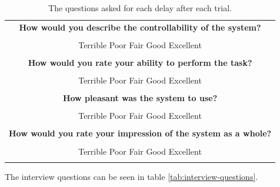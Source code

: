 \documentclass[nofilelist]{cslthse-msc}
\begin{document}
\begin{table}[!hbt]
   \centering
   \begin{tabular}{|c|}
      \hline
      \textbf{How would you describe the controllability of the system?} \\
      \\
      Terrible \hspace{10pt} Poor \hspace{10pt} Fair \hspace{10pt} Good \hspace{10pt} Excellent \\    
      \\
      \hline
      \textbf{How would you rate your ability to perform the task?} \\
      \\
      Terrible \hspace{10pt} Poor \hspace{10pt} Fair \hspace{10pt} Good \hspace{10pt} Excellent \\    
      \\
      \hline
      \textbf{How pleasant was the system to use?} \\
      \\
      Terrible \hspace{10pt} Poor \hspace{10pt} Fair \hspace{10pt} Good \hspace{10pt} Excellent \\    
      \\
      \hline
      \textbf{How would you rate your impression of the system as a whole?} \\
      \\
      Terrible \hspace{10pt} Poor \hspace{10pt} Fair \hspace{10pt} Good \hspace{10pt} Excellent \\    
      \\
      \hline
   \end{tabular}
   \caption{The questions asked for each delay after each trial.}
   \label{tab:form-questions}
\end{table}

\vspace{10pt}

The interview questions can be seen in table \ref{tab:interview-questions}.
\end{document}
